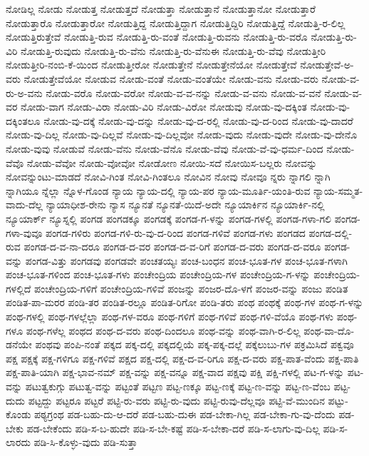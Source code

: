 {ನೋಡಿಲ್ಲ
ನೋಡು
ನೋಡುತ್ತ
ನೋಡುತ್ತದೆ
ನೋಡುತ್ತಾ
ನೋಡುತ್ತಾನೆ
ನೋಡುತ್ತಾನೋ
ನೋಡುತ್ತಾರೆ
ನೋಡುತ್ತಾರೊ
ನೋಡುತ್ತಾರೋ
ನೋಡುತ್ತಿದ್ದ
ನೋಡುತ್ತಿದ್ದಾಗ
ನೋಡುತ್ತಿದ್ದಿರಿ
ನೋಡುತ್ತಿದ್ದೆ
ನೋಡುತ್ತಿ-ರ-ಲಿಲ್ಲ
ನೋಡುತ್ತಿರುತ್ತೇವೆ
ನೋಡುತ್ತಿ-ರುವ
ನೋಡುತ್ತಿ-ರು-ವಂತೆ
ನೋಡುತ್ತಿ-ರುವನು
ನೋಡುತ್ತಿ-ರು-ವರೊ
ನೋಡುತ್ತಿ-ರು-ವಿರಿ
ನೋಡುತ್ತಿ-ರುವುದು
ನೋಡುತ್ತಿ-ರು-ವೆನು
ನೋಡುತ್ತಿ-ರು-ವೆನುಈ
ನೋಡುತ್ತಿ-ರು-ವೆವು
ನೋಡುತ್ತೀರಿ
ನೋಡುತ್ತೀರಿ-ನಂಬಿ-ಕೆ-ಯಿಂದ
ನೋಡುತ್ತೀರೋ
ನೋಡುತ್ತೇನೆ
ನೋಡುತ್ತೇನೆಯೋ
ನೋಡುತ್ತೇವೆ
ನೋಡುತ್ತೇವೆ-ಅ-ವರು
ನೋಡುತ್ತೇವೆಯೋ
ನೋಡುವ
ನೋಡು-ವಂತೆ
ನೋಡು-ವಂತೆಯೇ
ನೋಡು-ವನು
ನೋಡು-ವರು
ನೋಡು-ವ-ರು-ಅ-ವನು
ನೋಡು-ವರೊ
ನೋಡು-ವರೋ
ನೋಡು-ವ-ವ-ನನ್ನು
ನೋಡು-ವ-ವನು
ನೋಡು-ವ-ವನೆ
ನೋಡು-ವ-ವರ
ನೋಡು-ವಾಗ
ನೋಡು-ವಿರಾ
ನೋಡು-ವಿರಿ
ನೋಡು-ವಿರೋ
ನೋಡುವು
ನೋಡು-ವು-ದಕ್ಕಿಂತ
ನೋಡು-ವು-ದಕ್ಕಿಂತಲೂ
ನೋಡು-ವು-ದಕ್ಕೆ
ನೋಡು-ವು-ದನ್ನು
ನೋಡು-ವು-ದ-ರಲ್ಲಿ
ನೋಡು-ವು-ದ-ರಿಂದ
ನೋಡು-ವು-ದಾದರೆ
ನೋಡು-ವು-ದಿಲ್ಲ
ನೋಡು-ವು-ದಿಲ್ಲವೆ
ನೋಡು-ವು-ದಿಲ್ಲವೋ
ನೋಡು-ವುದು
ನೋಡು-ವುದೇ
ನೋಡು-ವು-ದೇನೊ
ನೋಡು-ವುವು
ನೋಡುವೆ
ನೋಡು-ವೆನು
ನೋಡು-ವೆನೊ
ನೋಡು-ವೆವು
ನೋಡು-ವೆ-ವು-ಧರ್ಮ-ದಿಂದ
ನೋಡು-ವೆವೊ
ನೋಡು-ವೆವೋ
ನೋಡು-ವೋವೋ
ನೋಡೋಣ
ನೋಯಿ-ಸದೆ
ನೋಯಿಸ-ಬಲ್ಲರು
ನೋವನ್ನು
ನೋವನ್ನುಂಟು-ಮಾಡದೆ
ನೋವಿ-ಗಿಂತ
ನೋವಿ-ಗಿಂತಲೂ
ನೋವಿನ
ನೋವು
ನೋವೂ
ನ್ನರು
ನ್ನಾಗಲಿ
ನ್ನಾಗಿ
ನ್ನಾಗಿಯೂ
ನ್ನೆಲ್ಲಾ
ನ್ನೊಳ-ಗೊಂಡ
ನ್ಯಾಯ
ನ್ಯಾಯ-ದಲ್ಲಿ
ನ್ಯಾಯ-ಪರ
ನ್ಯಾಯ-ಮೂರ್ತಿ-ಯಂತಿ-ರುವ
ನ್ಯಾಯ-ಸಮ್ಮತ-ವಾದು-ದೆಲ್ಲ
ನ್ಯಾಯಾಧೀಶ-ರೇನು
ನ್ಯಾಸ
ನ್ಯೂನತೆ
ನ್ಯೂನತೆ-ಯಿದೆ-ಅದೇ
ನ್ಯೂಯಾರ್ಕಿನ
ನ್ಯೂಯಾರ್ಕಿ-ನಲ್ಲಿ
ನ್ಯೂಯಾರ್ಕ್
ನ್ಯೂಸ್ನಲ್ಲಿ
ಪಂಗಡ
ಪಂಗಡಕ್ಕೂ
ಪಂಗಡಕ್ಕೆ
ಪಂಗಡ-ಗ-ಳನ್ನು
ಪಂಗಡ-ಗಳಲ್ಲಿ
ಪಂಗಡ-ಗಳಾ-ಗಲಿ
ಪಂಗಡ-ಗಳಾ-ವುವೂ
ಪಂಗಡ-ಗಳಿರು
ಪಂಗಡ-ಗಳಿ-ರು-ವು-ದ-ರಿಂದ
ಪಂಗಡ-ಗಳಿವೆ
ಪಂಗಡ-ಗಳು
ಪಂಗಡದ
ಪಂಗಡ-ದಲ್ಲಿ-ರುವ
ಪಂಗಡ-ದ-ವ-ನಾ-ದರೂ
ಪಂಗಡ-ದ-ವರ
ಪಂಗಡ-ದ-ವ-ರಿಗೆ
ಪಂಗಡ-ದ-ವರು
ಪಂಗಡ-ದ-ವರೂ
ಪಂಗಡ-ವನ್ನು
ಪಂಗಡ-ವಿತ್ತು
ಪಂಗಡವು
ಪಂಗಡವೇ
ಪಂಚತಯ್ಯಃ
ಪಂಚ-ಬಂಧನ
ಪಂಚ-ಭೂತ-ಗಳ
ಪಂಚ-ಭೂತ-ಗಳಾಗಿ
ಪಂಚ-ಭೂತ-ಗಳಿಂದ
ಪಂಚ-ಭೂತ-ಗಳು
ಪಂಚೇಂದ್ರಿಯ
ಪಂಚೇಂದ್ರಿಯ-ಗಳ
ಪಂಚೇಂದ್ರಿಯ-ಗ-ಳನ್ನು
ಪಂಚೇಂದ್ರಿಯ-ಗಳಲ್ಲಿದೆ
ಪಂಚೇಂದ್ರಿಯ-ಗಳಿಗೆ
ಪಂಚೇಂದ್ರಿಯ-ಗಳಿವೆ
ಪಂಜನ್ನು
ಪಂಜರ-ದೊ-ಳಗೆ
ಪಂಜರ-ವನ್ನು
ಪಂಜು
ಪಂಡಿತ
ಪಂಡಿತ-ಪಾ-ಮರರ
ಪಂಡಿ-ತರ
ಪಂಡಿತ-ರಲ್ಲೂ
ಪಂಡಿತ-ರಿಗೋ
ಪಂಡಿ-ತರು
ಪಂಥ
ಪಂಥಕ್ಕೆ
ಪಂಥ-ಗಳ
ಪಂಥ-ಗ-ಳನ್ನು
ಪಂಥ-ಗಳಲ್ಲಿ
ಪಂಥ-ಗಳಲ್ಲೆಲ್ಲಾ
ಪಂಥ-ಗಳ-ವರೂ
ಪಂಥ-ಗಳಿಗೆ
ಪಂಥ-ಗಳಿವೆ
ಪಂಥ-ಗಳಿ-ವೆಯೊ
ಪಂಥ-ಗಳು
ಪಂಥ-ಗಳೂ
ಪಂಥ-ಗಳೆಲ್ಲ
ಪಂಥದ
ಪಂಥ-ದ-ವರು
ಪಂಥ-ದಿಂದಲೂ
ಪಂಥ-ವನ್ನು
ಪಂಥ-ವಾಗಿ-ರ-ಲಿಲ್ಲ
ಪಂಥ-ವಾ-ದೊ-ಡನೆಯೇ
ಪಂಥವು
ಪಂಪಿ-ನಂತೆ
ಪಕ್ಕದ
ಪಕ್ಕ-ದಲ್ಲಿ
ಪಕ್ಕದಲ್ಲಿಯೆ
ಪಕ್ಕ-ಪಕ್ಕ-ದಲ್ಲೆ
ಪಕ್ಕೆಲುಬು-ಗಳ
ಪಕ್ರಮಿಸಿದೆ
ಪಕ್ವವೂ
ಪಕ್ಷ
ಪಕ್ಷಕ್ಕೆ
ಪಕ್ಷ-ಗಳಿಗೂ
ಪಕ್ಷ-ಗಳಿವೆ
ಪಕ್ಷದ
ಪಕ್ಷ-ದಲ್ಲಿ
ಪಕ್ಷ-ದ-ವ-ರಿಗೂ
ಪಕ್ಷ-ದ-ವರು
ಪಕ್ಷ-ಪಾತ-ವೆಂದು
ಪಕ್ಷ-ಪಾತಿ
ಪಕ್ಷ-ಪಾತಿ-ಯಾಗಿ
ಪಕ್ಷ-ಭಾವ-ನಮ್
ಪಕ್ಷ-ವನ್ನು
ಪಕ್ಷ-ವನ್ನೂ
ಪಕ್ಷ-ವಾದ
ಪಕ್ಷವು
ಪಕ್ಷಿ
ಪಕ್ಷಿ-ಗಳಲ್ಲಿ
ಪಟ-ಗ-ಳನ್ನು
ಪಟ-ವನ್ನು
ಪಟುತ್ವಕುಗ್ಗು
ಪಟುತ್ವ-ವನ್ನು
ಪಟ್ಟಂತೆ
ಪಟ್ಟಣ
ಪಟ್ಟ-ಣಕ್ಕೂ
ಪಟ್ಟ-ಣಕ್ಕೆ
ಪಟ್ಟ-ಣ-ವನ್ನು
ಪಟ್ಟ-ಣ-ವೆಂಬ
ಪಟ್ಟ-ದುದು
ಪಟ್ಟದ್ದು
ಪಟ್ಟರೂ
ಪಟ್ಟರೆ
ಪಟ್ಟಿ-ರು-ವರು
ಪಟ್ಟಿ-ರು-ವುದು
ಪಟ್ಟಿ-ರುವು-ದೆಲ್ಲವೂ
ಪಟ್ಟಿ-ವೆ-ಮುಂದಿನ
ಪಟ್ಟು-ಕೊಂಡು
ಪಠ್ಯಗ್ರಂಥ
ಪಡ-ಬಹು-ದು-ಆ-ದರೆ
ಪಡ-ಬಹು-ದುಈ
ಪಡ-ಬೇಕಾ-ಗಿಲ್ಲ
ಪಡ-ಬೇಕಾ-ಗು-ವು-ದೆಂದು
ಪಡ-ಬೇಕು
ಪಡ-ಬೇಕೆಂದು
ಪಡಿ-ಸ-ಬ-ಹುದೇ
ಪಡಿ-ಸ-ಬೇ-ಕಷ್ಟೆ
ಪಡಿ-ಸ-ಬೇಕಾ-ದರೆ
ಪಡಿ-ಸ-ಲಾಗು-ವು-ದಿಲ್ಲ
ಪಡಿ-ಸ-ಲಾರದು
ಪಡಿ-ಸಿ-ಕೊಳ್ಳು-ವುದು
ಪಡಿ-ಸುತ್ತಾ
}
